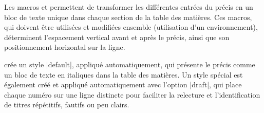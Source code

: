 \begin{developer}
Les macros  et  permettent de transformer les différentes entrées du précis en un bloc de texte unique dans chaque section de la table des matières. Ces macros, qui doivent être utilisées et modifiées ensemble (utilisation d'un environnement), déterminent l'espacement vertical avant et après le précis, ainsi que son positionnement horizontal sur la ligne.
\end{developer}

\begin{noprint}
\newcommand{\cftbeforeprecis}{%
	\vskip.5\baselineskip\par%
	\noindent\hspace{\dimexpr\toclabelwidth+\tocnumwidth}%
	\begin{minipage*}{\dimexpr\textwidth-\toclabelwidth-\tocnumwidth-\@pnumwidth}}
\newcommand{\cftafterprecis}{%
	\end{minipage*}%
	\vskip.5\baselineskip\par}
\end{noprint}

\frenchlaw crée un style |default|, appliqué automatiquement, qui présente le précis comme un bloc de texte en italiques dans la table des matières. Un style spécial est également créé et appliqué automatiquement avec l'option |draft|, qui place chaque numéro sur une ligne distincte pour faciliter la relecture et l'identification de titres répétitifs, fautifs ou peu clairs. 

